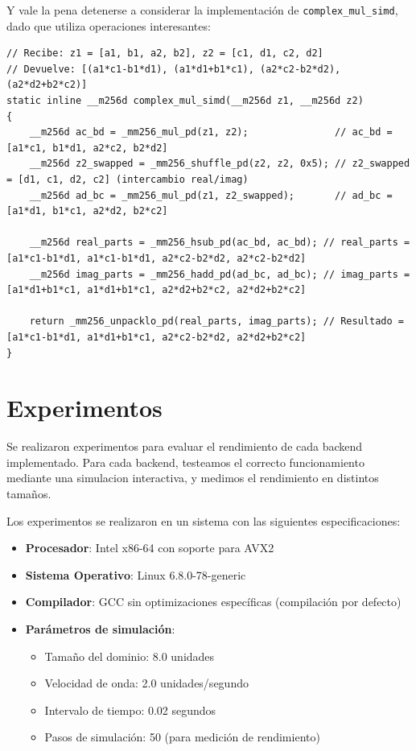 \documentclass[a4paper]{article}
\begin{document}
Y vale la pena detenerse a considerar la implementación de \texttt{complex\_mul\_simd}, dado que utiliza operaciones interesantes:
\begin{verbatim}
// Recibe: z1 = [a1, b1, a2, b2], z2 = [c1, d1, c2, d2]
// Devuelve: [(a1*c1-b1*d1), (a1*d1+b1*c1), (a2*c2-b2*d2), (a2*d2+b2*c2)]
static inline __m256d complex_mul_simd(__m256d z1, __m256d z2)
{
    __m256d ac_bd = _mm256_mul_pd(z1, z2);               // ac_bd = [a1*c1, b1*d1, a2*c2, b2*d2]
    __m256d z2_swapped = _mm256_shuffle_pd(z2, z2, 0x5); // z2_swapped = [d1, c1, d2, c2] (intercambio real/imag)
    __m256d ad_bc = _mm256_mul_pd(z1, z2_swapped);       // ad_bc = [a1*d1, b1*c1, a2*d2, b2*c2]

    __m256d real_parts = _mm256_hsub_pd(ac_bd, ac_bd); // real_parts = [a1*c1-b1*d1, a1*c1-b1*d1, a2*c2-b2*d2, a2*c2-b2*d2]
    __m256d imag_parts = _mm256_hadd_pd(ad_bc, ad_bc); // imag_parts = [a1*d1+b1*c1, a1*d1+b1*c1, a2*d2+b2*c2, a2*d2+b2*c2]

    return _mm256_unpacklo_pd(real_parts, imag_parts); // Resultado = [a1*c1-b1*d1, a1*d1+b1*c1, a2*c2-b2*d2, a2*d2+b2*c2]
}
\end{verbatim}

\section{Experimentos}

Se realizaron experimentos para evaluar el rendimiento de cada backend implementado. Para cada backend, testeamos el correcto funcionamiento mediante una simulacion interactiva, y medimos
el rendimiento en distintos tamaños.

Los experimentos se realizaron en un sistema con las siguientes especificaciones:
\begin{itemize}
    \item \textbf{Procesador}: Intel x86-64 con soporte para AVX2
    \item \textbf{Sistema Operativo}: Linux 6.8.0-78-generic
    \item \textbf{Compilador}: GCC sin optimizaciones específicas (compilación por defecto)
    \item \textbf{Parámetros de simulación}:
          \begin{itemize}
              \item Tamaño del dominio: 8.0 unidades
              \item Velocidad de onda: 2.0 unidades/segundo
              \item Intervalo de tiempo: 0.02 segundos
              \item Pasos de simulación: 50 (para medición de rendimiento)
          \end{itemize}
\end{itemize}
\end{document}
